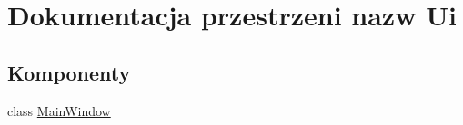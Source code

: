 \hypertarget{namespace_ui}{}\section{Dokumentacja przestrzeni nazw Ui}
\label{namespace_ui}
\subsection*{Komponenty}
\begin{DoxyCompactItemize}
\item 
class \hyperlink{class_ui_1_1_main_window}{Main\+Window}
\end{DoxyCompactItemize}
